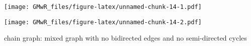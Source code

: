 \documentclass[]{article}
\newenvironment{Shaded}{\begin{snugshade}}{\end{snugshade}}
\newcommand{\KeywordTok}[1]{\textcolor[rgb]{0.13,0.29,0.53}{\textbf{#1}}}
\newcommand{\DataTypeTok}[1]{\textcolor[rgb]{0.13,0.29,0.53}{#1}}
\newcommand{\DecValTok}[1]{\textcolor[rgb]{0.00,0.00,0.81}{#1}}
\newcommand{\StringTok}[1]{\textcolor[rgb]{0.31,0.60,0.02}{#1}}
\newcommand{\CommentTok}[1]{\textcolor[rgb]{0.56,0.35,0.01}{\textit{#1}}}
\newcommand{\OperatorTok}[1]{\textcolor[rgb]{0.81,0.36,0.00}{\textbf{#1}}}
\newcommand{\NormalTok}[1]{#1}
\begin{document}
\texttt{[image: GMwR\_files/figure-latex/unnamed-chunk-14-1.pdf]}

\begin{Shaded}
\end{Shaded}

\texttt{[image: GMwR\_files/figure-latex/unnamed-chunk-14-2.pdf]}

chain graph: mixed graph with no bidirected edges and no semi-directed
cycles
\end{document}
